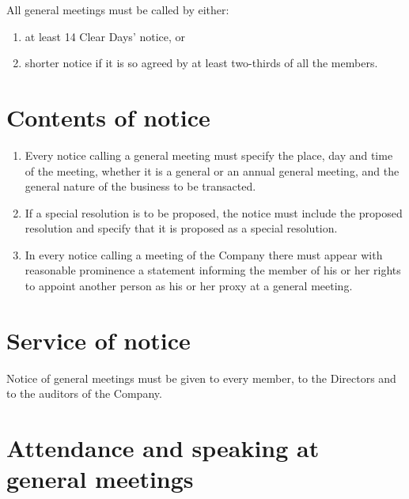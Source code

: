 \documentclass[a4paper,12pt]{article}
\begin{document}
All general meetings must be called by either:

\begin{enumerate}
  \item at least 14 Clear Days’ notice, or
  \item shorter notice if it is so agreed by at least two-thirds of all the members. %
\end{enumerate}

\section{Contents of notice}

\begin{enumerate}
  \item Every notice calling a general meeting must specify the place, day and time of the meeting, whether it is a general or an annual general meeting, and the general nature of the business to be transacted.
  \item If a special resolution is to be proposed, the notice must include the proposed resolution and specify that it is proposed as a special resolution.
  \item In every notice calling a meeting of the Company there must appear with reasonable prominence a statement informing the member of his or her rights to appoint another person as his or her proxy at a general meeting.
\end{enumerate}

\section{Service of notice}

Notice of general meetings must be given to every member, to the Directors and to the auditors of the Company.

\section{Attendance and speaking at general meetings}
\end{document}
